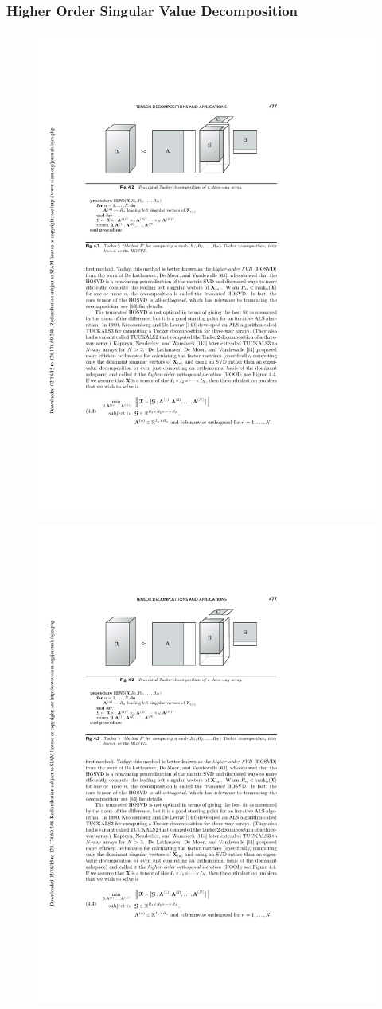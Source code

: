 \documentclass{beamer}
\begin{document}
\begin{frame}[fragile] %
\frametitle{Higher Order Singular Value Decomposition}
\begin{block}{}
\begin{figure}
\includegraphics[width=0.6\linewidth]{AlgoHOSVD}
\end{figure}
\end{block}
\centering
\begin{figure}\includegraphics[scale=0.6]{HOSVD.pdf} \end{figure}

\end{frame}
\end{document}

